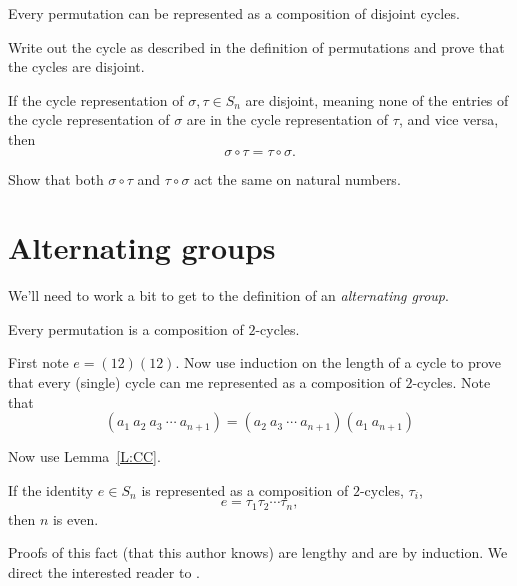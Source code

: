 \documentclass{ximera}
\begin{document}
\begin{lemma}\label{L:CC}
  Every permutation can be represented as a composition of disjoint
  cycles.
  \begin{sketch}
    Write out the cycle as described in the definition of permutations
    and prove that the cycles are disjoint.
  \end{sketch}
\end{lemma}

\begin{lemma}
  If the cycle representation of $\sigma,\tau\in S_n$ are disjoint,
  meaning none of the entries of the cycle representation of $\sigma$
  are in the cycle representation of $\tau$, and vice versa, then
  \[
  \sigma \circ \tau = \tau \circ \sigma.
  \]
  \begin{sketch}
    Show that both $\sigma \circ \tau$ and $\tau \circ \sigma$ act the
    same on natural numbers.
  \end{sketch} 
\end{lemma}




\section{Alternating groups}


We'll need to work a bit to get to the definition of an
\textit{alternating group}.






\begin{lemma}
  Every permutation is a composition of $2$-cycles.
  \begin{sketch}
    First note $e = (12)(12)$. Now use induction on the length of a
    cycle to prove that every (single) cycle can me represented as a
    composition of $2$-cycles. Note that
    \[
    (a_1 \ a_2 \ a_3 \ \cdots \ a_{n+1}) = (a_2 \ a_3 \ \cdots \ a_{n+1}) (a_1 \ a_{n+1}) 
    \]

    Now use Lemma~\ref{L:CC}.
  \end{sketch}
\end{lemma}



\begin{lemma}
  If the identity $e\in S_n$ is represented as a composition of $2$-cycles, $\tau_i$, 
  \[
  e = \tau_1 \tau_2 \cdots \tau_n,
  \]
  then $n$ is even.
  \begin{sketch}
    Proofs of this fact (that this author knows) are lengthy and are
    by induction. We direct the interested reader to \cite{jG2017}.
  \end{sketch}
\end{lemma}
\end{document}
